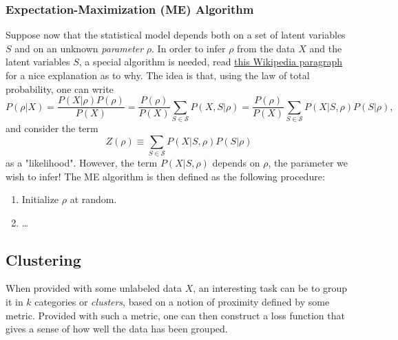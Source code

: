 \documentclass{article}
\begin{document}
\subsubsection*{Expectation-Maximization (ME) Algorithm}
\label{sec:EM}
Suppose now that the statistical model depends both on a set of latent variables $S$ and on an unknown \emph{parameter} $\rho$. In order to infer $\rho$ from the data $X$ and the latent variables $S$, a special algorithm is needed, read \href{https://en.wikipedia.org/wiki/Expectation-maximization_algorithm#Introduction}{this Wikipedia paragraph} for a nice explanation as to why. The idea is that, using the law of total probability, one can write
\begin{equation}
    P(\rho | X)
    =
    \frac{P(X|\rho) P(\rho)}{P(X)}
    =
    \frac{P(\rho)}{P(X)}
    \sum_{S\in\mathcal{S}} P(X,S|\rho)
    =
    \frac{P(\rho)}{P(X)}
    \sum_{S\in\mathcal{S}} P(X|S,\rho) P(S|\rho),
\end{equation}
and consider the term
$$Z(\rho) \equiv \sum_{S\in\mathcal{S}} P(X|S,\rho) P(S|\rho)$$
as a "likelihood". However, the term $P(X|S,\rho)$ depends on $\rho$, the parameter we wish to infer! The ME algorithm is then defined as the following procedure:
\begin{enumerate}
    \item Initialize $\rho$ at random.
    \item \dots
\end{enumerate}

\subsection{Clustering}
When provided with some unlabeled data $X$, an interesting task can be to group it in $k$ categories or \emph{clusters}, based on a notion of proximity defined by some metric. Provided with such a metric, one can then construct a loss function that gives a sense of how well the data has been grouped.
\end{document}
